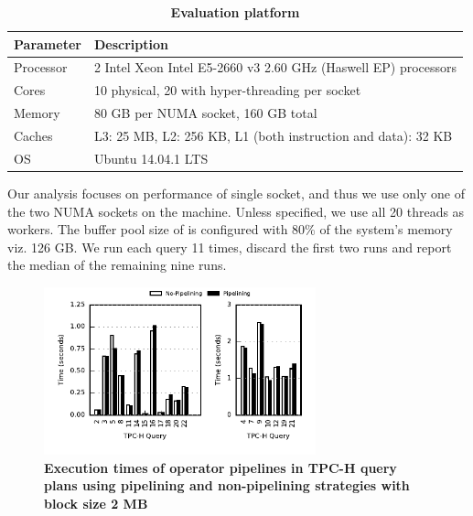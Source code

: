 \begin{table}[h]
	\centering
	\begin{tabular}{|l|l|}
		\hline
		\textbf{Parameter} & \textbf{Description} \\ \hline
		Processor & 2 Intel Xeon Intel E5-2660 v3 2.60 GHz (Haswell EP) processors\\ \hline
		Cores & 10 physical, 20 with hyper-threading per socket \\ \hline
		Memory & 80 GB per NUMA socket, 160 GB total \\ \hline
		Caches & L3: 25 MB, L2: 256 KB, L1 (both instruction and data): 32 KB \\ \hline
		OS & Ubuntu 14.04.1 LTS \\ \hline
	\end{tabular}
	\caption{\textbf{Evaluation platform}}
	\label{table:hardware-pipeline}
\end{table}

Our analysis focuses on performance of single socket, and thus we use only one of the two NUMA sockets on the machine.
Unless specified, we use all 20 threads as \sys{} workers.
The buffer pool size of \sys{} is configured with 80\% of the system's memory viz. 126 GB.
We run each query 11 times, discard the first two runs and report the median of the remaining nine runs. 



\begin{figure}[ht]
	\centering 
	\includegraphics[width=0.7\textwidth]{pipeline/figures/deep-pipeline-comparison-2mb-withlip}
	\caption{\textbf{Execution times of operator pipelines in TPC-H query plans using pipelining and non-pipelining strategies with block size 2 MB}}
	\label{fig:deep-pipeline-comparison-2mb}
\end{figure}

